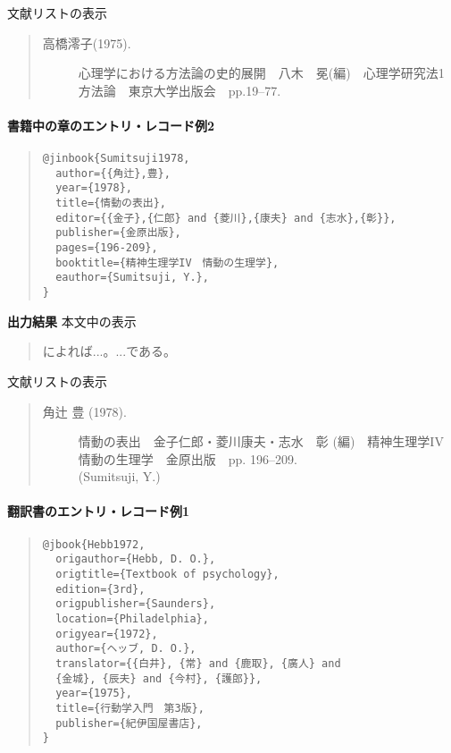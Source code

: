 \documentclass[12pt]{ltjsarticle}
\begin{document}
文献リストの表示

\begin{quote}
\begin{description}
  \item[\textrm{高橋澪子(1975).}]心理学における方法論の史的展開　八木　冕(編)　心理学研究法1　方法論　東京大学出版会　pp.19--77.
\end{description}
\end{quote}


\paragraph{書籍中の章のエントリ・レコード例2}

\begin{quote}
\begin{verbatim}
@jinbook{Sumitsuji1978,
  author={{角辻},豊},
  year={1978},
  title={情動の表出},
  editor={{金子},{仁郎} and {菱川},{康夫} and {志水},{彰}},
  publisher={金原出版},
  pages={196-209},
  booktitle={精神生理学IV　情動の生理学},
  eauthor={Sumitsuji, Y.},
}
\end{verbatim}
\end{quote}


\textbf{出力結果}
本文中の表示
\begin{quote}
\textcite{Sumitsuji1978}によれば...。...である\parencite{Sumitsuji1978}。
\end{quote}


文献リストの表示

\begin{quote}
\begin{description}
  \item[\textrm{角辻 豊 (1978).}]情動の表出　金子仁郎・菱川康夫・志水　彰 (編)　精神生理学IV　情動の生理学　金原出版　pp. 196--209.\\
(Sumitsuji, Y.)
\end{description}
\end{quote}


\paragraph{翻訳書のエントリ・レコード例1}

\begin{quote}
\begin{verbatim}
@jbook{Hebb1972,
  origauthor={Hebb, D. O.},
  origtitle={Textbook of psychology},
  edition={3rd},
  origpublisher={Saunders},
  location={Philadelphia},
  origyear={1972},
  author={ヘッブ, D. O.},
  translator={{白井}, {常} and {鹿取}, {廣人} and 
  {金城}, {辰夫} and {今村}, {護郎}},
  year={1975},
  title={行動学入門　第3版},
  publisher={紀伊国屋書店},
}
\end{verbatim}
\end{quote}
\end{document}
